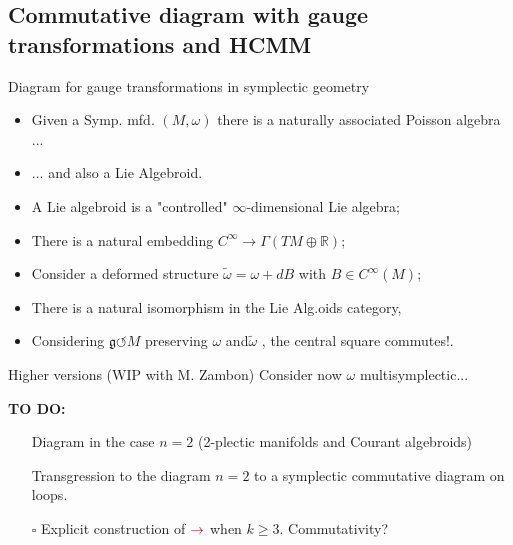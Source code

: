 \documentclass[handout,10pt]{beamer}
\begin{document}
\subsection{Commutative diagram with gauge transformations and HCMM}

\begin{frame}{Diagram for gauge transformations in symplectic geometry}
	\vfill
	
	\begin{itemize}
		\item<2-> Given a Symp. mfd. $(M,\omega)$ there is a naturally associated Poisson algebra ...
		\item<3-> ... and also a Lie Algebroid.
		\item<4-> A Lie algebroid is a "controlled" $\infty$-dimensional Lie algebra;
		\item<5-> There is a natural embedding $C^\infty \to \Gamma(TM\oplus\mathbb{R})$;
		\item<6-> Consider a deformed structure $\tilde{\omega}= \omega + d B$ with $B\in C^\infty(M)$;
		\item<7-> There is a natural isomorphism in the Lie Alg.oids category,
		\item<8-> Considering $\mathfrak{g}\circlearrowleft M$ preserving $\omega$ and$\tilde{\omega}$ , \alert{the central square commutes!}.
	\end{itemize}
\end{frame}

\begin{frame}{Higher versions (WIP with M. Zambon)}
	Consider now $\omega$ multisymplectic...
	\vfill
	
	\vfill
	\textbf{TO DO:}
	\begin{itemize}
		\item[\CheckedBox] Diagram in the case $n=2$ (2-plectic manifolds and Courant algebroids)
		\item[\CheckedBox] Transgression to the diagram $n=2$ to a symplectic commutative diagram on loops.
		\item[$\square$] Explicit construction of $\mathbf{\color{red!60!black}\rightarrow}$ when $k\geq 3$. Commutativity? 
	\end{itemize}
\end{frame}
\note[itemize]{
	\item
}
\end{document}
